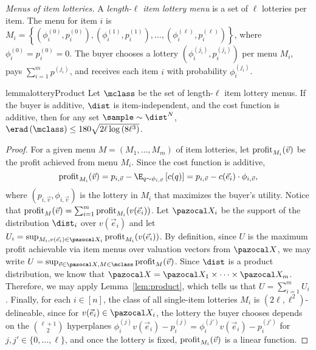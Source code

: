 \medskip\emph{Menus of item lotteries.} A \emph{length-$\ell$ item lottery menu} is a set of $\ell$ lotteries per item. The menu for item $i$ is $M_i = \left\{\left(\phi_i^{\left(0\right)}, p_i^{\left(0\right)}\right), \left(\phi_i^{\left(1\right)}, p_i^{\left(1\right)}\right), \dots, \left(\phi_i^{\left(\ell\right)}, p_i^{\left(\ell\right)}\right)\right\}$, where $\phi_i^{\left(0\right)}= p_i^{\left(0\right)}= 0$. The buyer chooses a lottery $\left(\phi_i^{\left(j_i\right)}, p_i^{\left(j_i\right)}\right)$ per menu $M_i$, pays $\sum_{i = 1}^m p^{\left(j_i\right)}$, and receives each item $i$ with probability $\phi_i^{\left(j_i\right)}$. 

\begin{restatable}{lemma}{lotteryProduct}\label{lem:lottery_product}
	Let $\mclass$ be the set of length-$\ell$ item lottery menus. If the buyer is additive, $\dist$ is item-independent, and the cost function is additive, then for any set $\sample \sim \dist^N$, $\erad\left(\mclass\right) \leq 180\sqrt{2\ell \log\left(8\ell^3\right)}$.
\end{restatable}

\begin{proof}
For a given menu $M = \left(M_1, \dots, M_m\right)$ of item lotteries, let $\textnormal{profit}_{M_i}(\vec{v})$ be the profit achieved from menu $M_i$. Since the cost function is additive, \[\profit_{M_i} (\vec{v}) = p_{i,\vec{v}} - \E_{q \sim \phi_{i, \vec{v}}}\left[c(q)\right] = p_{i,\vec{v}} - c(\vec{e}_i)\cdot \phi_{i, \vec{v}},\] where $(p_{i, \vec{v}}, \phi_{i, \vec{v}})$ is the lottery in $M_i$ that maximizes the buyer's utility.
Notice that $\textnormal{profit}_{M}(\vec{v}) = \sum_{i = 1}^m \textnormal{profit}_{M_i}(v(\vec{e}_i))$. Let $\domain_i$ be the support of the distribution $\dist_i$ over $v(\vec{e}_i)$ and let $U_i = \sup_{M_i, v(\vec{e}_i) \in \domain_i} \profit_{M_i}(v(\vec{e}_i))$. By definition, since $U$ is the maximum profit achievable via item menus over valuation vectors from $\domain$, we may write $U = \sup_{\vec{v} \in \domain, M \in \mclass}\profit_{M}(\vec{v})$.  Since $\dist$ is a product distribution, we know that $\domain = \domain_1 \times \cdots \times \domain_m$. Therefore, we may apply Lemma~\ref{lem:product}, which tells us that $U = \sum_{i = 1}^m U_i$. Finally, for each $i \in [n]$, the class of all single-item lotteries $M_i$ is $(2\ell, \ell^2)$-delineable, since for $v(\vec{e}_i) \in \domain_i$, the lottery the buyer chooses depends on the ${\ell + 1 \choose 2}$ hyperplanes $\phi_i^{(j)}v(\vec{e}_i) - p_i^{(j)} = \phi_i^{(j')}v(\vec{e}_i) - p_i^{(j')}$ for $j, j' \in \{0, \dots, \ell\}$, and once the lottery is fixed, $\textnormal{profit}_{M_i} (\vec{v})$ is a linear function.
\end{proof}

